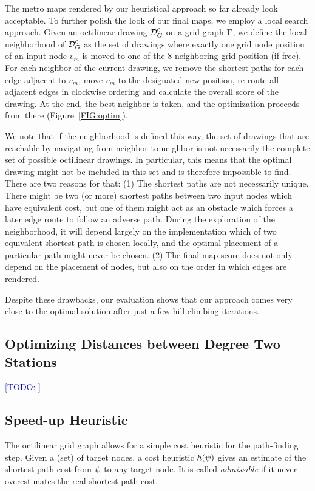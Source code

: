 \documentclass[sigconf]{acmart}
\newcommand\TODO[1]{\textcolor{blue}{\small [TODO: #1]}}
\begin{document}
The metro maps rendered by our heuristical approach so far already look acceptable.
To further polish the look of our final maps, we employ a local search approach.
Given an octilinear drawing $\mathcal{D}_{G}^0$ on a grid graph $\Gamma$, we define the local neighborhood of $\mathcal{D}_{G}^0$ as the set of drawings where exactly one grid node position of an input node $v_m$ is moved to one of the 8 neighboring grid position (if free).
For each neighbor of the current drawing, we remove the shortest paths for each edge adjacent to $v_m$, move $v_m$ to the designated new position, re-route all adjacent edges in clockwise ordering and calculate the overall score of the drawing.
At the end, the best neighbor is taken, and the optimization proceeds from there (Figure~\ref{FIG:optim}).

We note that if the neighborhood is defined this way, the set of drawings that are reachable by navigating from neighbor to neighbor is not necessarily the complete set of possible octilinear drawings.
In particular, this means that the optimal drawing might not be included in this set and is therefore impossible to find.
There are two reasons for that: 
(1) The shortest paths are not necessarily unique.
There might be two (or more) shortest paths between two input nodes which have equivalent cost, but one of them might act as an obstacle which forces a later edge route to follow an adverse path.
During the exploration of the neighborhood, it will depend largely on the implementation which of two equivalent shortest path is chosen locally, and the optimal placement of a particular path might never be chosen.
(2) The final map score does not only depend on the placement of nodes, but also on the order in which edges are rendered.

Despite these drawbacks, our evaluation shows that our approach comes very close to the optimal solution after just a few hill climbing iterations.

\subsection{Optimizing Distances between Degree Two Stations}

\TODO{}

\subsection{Speed-up Heuristic}

The octilinear grid graph allows for a simple cost heuristic for the path-finding step.
Given a (set) of target nodes, a cost heuristic $h(\psi)$ gives an estimate of the shortest path cost from $\psi$ to any target node.
It is called \emph{admissible} if it never overestimates the real shortest path cost.
\end{document}
